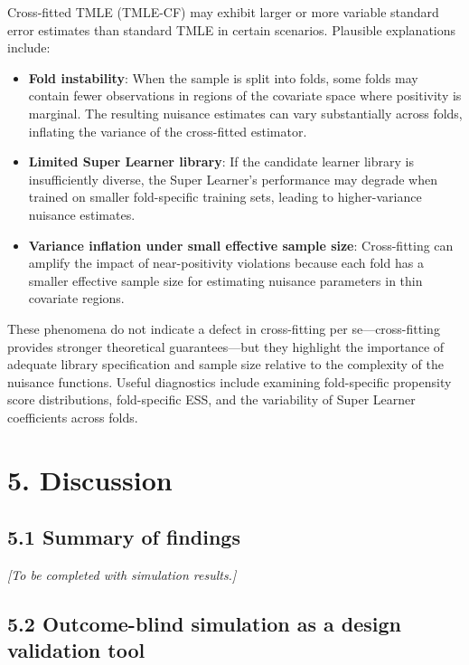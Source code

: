 \documentclass[
  letterpaper,
  DIV=11,
  numbers=noendperiod]{scrartcl}
\begin{document}
Cross-fitted TMLE (TMLE-CF) may exhibit larger or more variable standard
error estimates than standard TMLE in certain scenarios. Plausible
explanations include:

\begin{itemize}
\item
  \textbf{Fold instability}: When the sample is split into folds, some
  folds may contain fewer observations in regions of the covariate space
  where positivity is marginal. The resulting nuisance estimates can
  vary substantially across folds, inflating the variance of the
  cross-fitted estimator.
\item
  \textbf{Limited Super Learner library}: If the candidate learner
  library is insufficiently diverse, the Super Learner's performance may
  degrade when trained on smaller fold-specific training sets, leading
  to higher-variance nuisance estimates.
\item
  \textbf{Variance inflation under small effective sample size}:
  Cross-fitting can amplify the impact of near-positivity violations
  because each fold has a smaller effective sample size for estimating
  nuisance parameters in thin covariate regions.
\end{itemize}

These phenomena do not indicate a defect in cross-fitting per
se---cross-fitting provides stronger theoretical guarantees---but they
highlight the importance of adequate library specification and sample
size relative to the complexity of the nuisance functions. Useful
diagnostics include examining fold-specific propensity score
distributions, fold-specific ESS, and the variability of Super Learner
coefficients across folds.

\section{5. Discussion}\label{discussion}

\subsection{5.1 Summary of findings}\label{summary-of-findings}

\emph{{[}To be completed with simulation results.{]}}

\subsection{5.2 Outcome-blind simulation as a design validation
tool}\label{outcome-blind-simulation-as-a-design-validation-tool}
\end{document}
